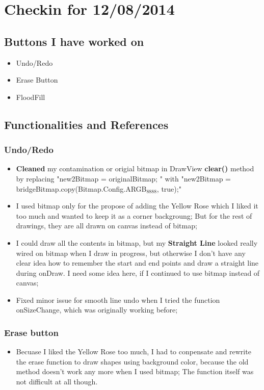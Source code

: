 \documentclass[9pt,b5paper]{article}
\begin{document}
\section{Checkin for 12/08/2014}
\label{sec-6}
\subsection{Buttons I have worked on}
\label{sec-6-1}
\begin{itemize}
\item Undo/Redo
\item Erase Button
\item FloodFill
\end{itemize}
\subsection{Functionalities and References}
\label{sec-6-2}
\subsubsection{Undo/Redo}
\label{sec-6-2-1}
\begin{itemize}
\item \textbf{Cleaned} my contamination or origial bitmap in DrawView \textbf{clear()} method by replacing "new2Bitmap = originalBitmap; " with "new2Bitmap = bridgeBitmap.copy(Bitmap.Config.ARGB$_{\text{8888}}$, true);"
\item I used bitmap only for the propose of adding the Yellow Rose which I liked it too much and wanted to keep it as a corner backgroung; But for the rest of drawings, they are all drawn on canvas instead of bitmap;
\item I could draw all the contents in bitmap, but my \textbf{Straight Line} looked really wired on bitmap when I draw in progress, but otherwise I don't have any clear idea how to remember the start and end points and draw a straight line during onDraw. I need some idea here, if I continued to use bitmap instead of canvas;
\item Fixed minor issue for smooth line undo when I tried the function onSizeChange, which was originally working before;
\end{itemize}
\subsubsection{Erase button}
\label{sec-6-2-2}
\begin{itemize}
\item Becuase I liked the Yellow Rose too much, I had to conpensate and rewrite the erase function to draw shapes using background color, because the old method doesn't work any more when I used bitmap; The function itself was not difficult at all though.
\end{itemize}
\end{document}
